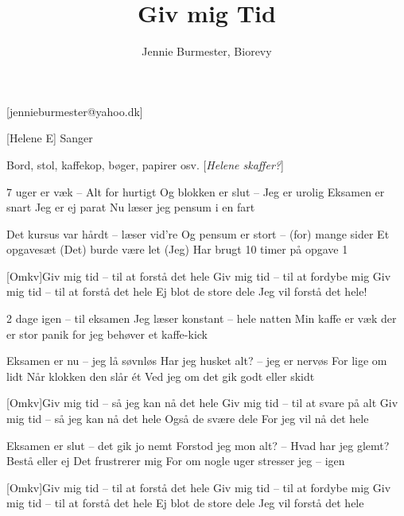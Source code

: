 \documentclass[a4paper,12pt]{article}
\title{Giv mig Tid}
\author{Jennie Burmester, Biorevy}
\begin{document}
\maketitle

\begin{texxers}
	[jennieburmester@yahoo.dk]
\end{texxers}

\begin{roles}
	[Helene E] Sanger
\end{roles}


\begin{props}
	 Bord, stol, kaffekop, bøger, papirer osv. [\textit{Helene skaffer?}] 
\end{props}

\begin{song}

7 uger er væk -- Alt for hurtigt
Og blokken er slut -- Jeg er urolig
Eksamen er snart
Jeg er ej parat
Nu læser jeg pensum i en fart

Det kursus var hårdt -- læser vid're
Og pensum er stort -- (for) mange sider
Et opgavesæt
(Det) burde være let
(Jeg) Har brugt 10 timer på opgave 1

[Omkv]Giv mig tid -- til at forstå det hele
Giv mig tid -- til at fordybe mig
Giv mig tid -- til at forstå det hele
Ej blot de store dele
Jeg vil forstå det hele!

2 dage igen -- til eksamen
Jeg læser konstant -- hele natten
Min kaffe er væk
der er stor panik
for jeg behøver et kaffe-kick 

Eksamen er nu -- jeg lå søvnløs 
Har jeg husket alt? -- jeg er nervøs
For lige om lidt
Når klokken den slår ét
Ved jeg om det gik godt eller skidt

[Omkv]Giv mig tid -- så jeg kan nå det hele
Giv mig tid -- til at svare på alt
Giv mig tid -- så jeg kan nå det hele
Også de svære dele
For jeg vil nå det hele

Eksamen er slut -- det gik jo nemt 
Forstod jeg mon alt? -- Hvad har jeg glemt?
Bestå eller ej
Det frustrerer mig
For om nogle uger stresser jeg -- igen

[Omkv]Giv mig tid -- til at forstå det hele
Giv mig tid -- til at fordybe mig
Giv mig tid -- til at forstå det hele
Ej blot de store dele
Jeg vil forstå det hele

\end{song}
\end{document}

